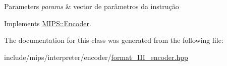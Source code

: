 \begin{DoxyParams}{Parameters}
{\em params} & vector de parâmetros da instrução \\
\hline
\end{DoxyParams}


Implements \hyperlink{classMIPS_1_1Encoder_a4a29c42d601460be8e8d353d8fc0da34}{M\+I\+P\+S\+::\+Encoder}.



The documentation for this class was generated from the following file\+:\begin{DoxyCompactItemize}
\item 
include/mips/interpreter/encoder/\hyperlink{format__III__encoder_8hpp}{format\+\_\+\+I\+I\+I\+\_\+encoder.\+hpp}\end{DoxyCompactItemize}
